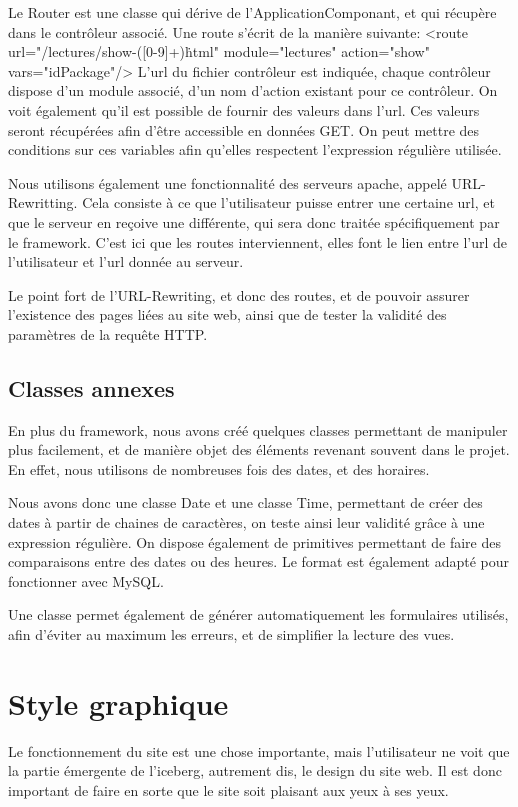 Le Router est une classe qui dérive de l'ApplicationComponant, et qui récupère dans le contrôleur associé.
Une route s'écrit de la manière suivante:
<route url="/lectures/show-([0-9]+)\.html" module="lectures" action="show" vars="idPackage"/>
L'url du fichier contrôleur est indiquée, chaque contrôleur dispose d'un module associé, d'un nom d'action existant pour ce
contrôleur. On voit également qu'il est possible de fournir des valeurs dans l'url. Ces valeurs seront récupérées afin
d'être accessible en données GET. On peut mettre des conditions sur ces variables afin qu'elles respectent l'expression régulière
utilisée.

Nous utilisons également une fonctionnalité des serveurs apache, appelé URL-Rewritting. Cela consiste à ce que l'utilisateur
puisse entrer une certaine url, et que le serveur en reçoive une différente, qui sera donc traitée spécifiquement par le framework.
C'est ici que les routes interviennent, elles font le lien entre l'url de l'utilisateur et l'url donnée au serveur.

Le point fort de l'URL-Rewriting, et donc des routes, et de pouvoir assurer l'existence des pages liées au site web,
ainsi que de tester la validité des paramètres de la requête HTTP.

        \subsection{Classes annexes}

En plus du framework, nous avons créé quelques classes permettant de manipuler plus facilement, et de manière objet
des éléments revenant souvent dans le projet. En effet, nous utilisons de nombreuses fois des dates, et des horaires.

Nous avons donc une classe Date et une classe Time, permettant de créer des dates à partir de chaines de caractères,
on teste ainsi leur validité grâce à une expression régulière. On dispose également de primitives permettant de
faire des comparaisons entre des dates ou des heures. Le format est également adapté pour fonctionner avec MySQL.

Une classe permet également de générer automatiquement les formulaires utilisés, afin d'éviter au maximum les erreurs,
et de simplifier la lecture des vues.




    \section{Style graphique}
Le fonctionnement du site est une chose importante, mais l'utilisateur ne voit que
la partie émergente de l'iceberg, autrement dis, le design du site web. Il est donc
important de faire en sorte que le site soit plaisant aux yeux à ses yeux. 

